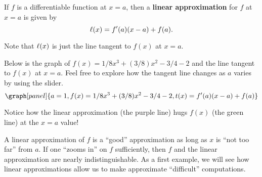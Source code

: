 \documentclass[handout,nooutcomes]{ximera}
\begin{document}
\begin{question}
\begin{definition}
If $f$ is a differentiable function at $x=a$, then a \textbf{linear
  approximation} for $f$ at $x=a$ is given by
\[
\ell(x) = f'(a)(x-a) +f(a).
\]
\end{definition}


Note that $\ell(x)$ is just the line tangent to $f(x)$ at $x=a$.

\begin{example}
Below is the graph of $f(x) = 1/8x^3 + (3/8)x^2 -3/4 - 2$ and the line tangent to $f(x)$ at $x=a$. Feel free to explore how the tangent line changes as $a$ varies by using the slider.
\[
\graph[panel]{a=1, f(x) = 1/8x^3 + (3/8)x^2 -3/4 - 2, t(x) = f'(a)(x-a)+ f(a)}
\]

Notice how the linear approximation (the purple line) hugs
$f(x)$ (the green line) at the $x=a$ value!
\end{example}

A linear approximation of $f$ is a ``good'' approximation as long as
$x$ is ``not too far'' from $a.$
If one ``zooms in'' on $f$ sufficiently, then $f$ and the linear
approximation are nearly indistinguishable. As a first example, we
will see how linear approximations allow us to make approximate
``difficult'' computations.
\end{question}
\end{document}
